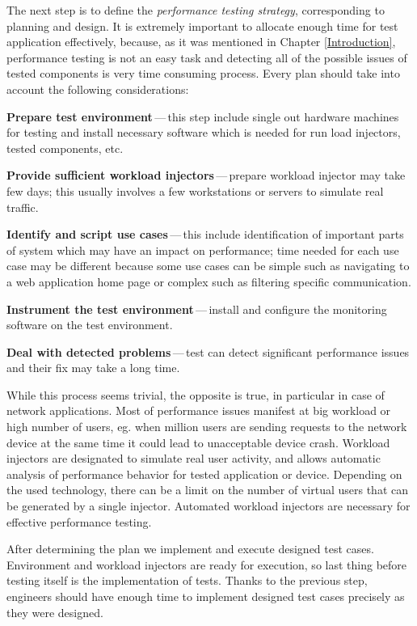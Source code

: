 The next step is to define the \emph{performance testing strategy}, corresponding to planning and design. It is extremely important to allocate enough time for test application effectively, because, as it was mentioned in Chapter \ref{Introduction}, performance testing is not an easy task and detecting all of the possible issues of tested components is very time consuming process. Every plan should take into account the following considerations:

\begin{description}
	\setlength\itemsep{0em}
	\item \textbf{Prepare test environment}\,---\,this step include single out hardware machines for testing and install necessary software which is needed for run load injectors, tested components, etc.
	\item \textbf{Provide sufficient workload injectors}\,---\,prepare workload injector may take few days; this usually involves a few workstations or servers to simulate real traffic.
	\item \textbf{Identify and script use cases}\,---\,this include identification of important parts of system which may have an impact on performance; time needed for each use case may be different because some use cases can be simple such as navigating to a web application home page or complex such as filtering specific communication.
	\item \textbf{Instrument the test environment}\,---\,install and configure the monitoring software on the test environment.
	\item \textbf{Deal with detected problems}\,---\,test can detect significant performance issues and their fix may take a long time.
\end{description}

While this process seems trivial, the opposite is true, in particular in case of network applications. Most of performance issues manifest at big workload or high number of users, eg. when million users are sending requests to the network device at the same time it could lead to unacceptable device crash. Workload injectors are designated to simulate real user activity, and allows automatic analysis of performance behavior for tested application or device. Depending on the used technology, there can be a limit on the number of virtual users that can be generated by a single injector. Automated workload injectors are necessary for effective performance testing.

After determining the plan we implement and execute designed test cases. Environment and workload injectors are ready for execution, so last thing before testing itself is the implementation of tests. Thanks to the previous step, engineers should have enough time to implement designed test cases precisely as they were designed. 

